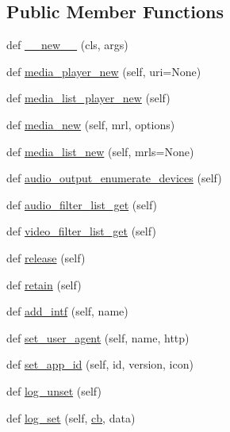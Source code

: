 \subsection*{Public Member Functions}
\begin{DoxyCompactItemize}
\item 
def \hyperlink{classvlc_1_1_instance_acc2aa3fac6a63e8bac4f19efc327102b}{\+\_\+\+\_\+new\+\_\+\+\_\+} (cls, args)
\item 
def \hyperlink{classvlc_1_1_instance_a356a94c765e690cec25514e36101c6d7}{media\+\_\+player\+\_\+new} (self, uri=None)
\item 
def \hyperlink{classvlc_1_1_instance_af64a515387ea79e6f6f97621283c4a33}{media\+\_\+list\+\_\+player\+\_\+new} (self)
\item 
def \hyperlink{classvlc_1_1_instance_ac9af019663459bddfa7376f3692754d9}{media\+\_\+new} (self, mrl, options)
\item 
def \hyperlink{classvlc_1_1_instance_ab3c8e7cd9dd61ca1657ba238cd4cf476}{media\+\_\+list\+\_\+new} (self, mrls=None)
\item 
def \hyperlink{classvlc_1_1_instance_a6fdfa4effb01d9a1ebfde60527f7508b}{audio\+\_\+output\+\_\+enumerate\+\_\+devices} (self)
\item 
def \hyperlink{classvlc_1_1_instance_a267774a685e64a5f8f666a4b6f8ac85f}{audio\+\_\+filter\+\_\+list\+\_\+get} (self)
\item 
def \hyperlink{classvlc_1_1_instance_a72cb3f80f491fa38104614e5966cc396}{video\+\_\+filter\+\_\+list\+\_\+get} (self)
\item 
def \hyperlink{classvlc_1_1_instance_a4cd51e19135e5ad4a19eae3ea9c60537}{release} (self)
\item 
def \hyperlink{classvlc_1_1_instance_a6394d82a0b79f0f91bb059d20ab43490}{retain} (self)
\item 
def \hyperlink{classvlc_1_1_instance_a2f16d4ca3ce5f13e304911d652e8bf6c}{add\+\_\+intf} (self, name)
\item 
def \hyperlink{classvlc_1_1_instance_a363684325b3a6baa1168f7f89f4b9bb4}{set\+\_\+user\+\_\+agent} (self, name, http)
\item 
def \hyperlink{classvlc_1_1_instance_adfcc438909535cf3bc6e8c0de2009db3}{set\+\_\+app\+\_\+id} (self, id, version, icon)
\item 
def \hyperlink{classvlc_1_1_instance_a7785fcbfc657f19465b52c9130d8df63}{log\+\_\+unset} (self)
\item 
def \hyperlink{classvlc_1_1_instance_ab18316368daf58ca970aa6369e9641eb}{log\+\_\+set} (self, \hyperlink{namespacevlc_a48994b0a618061e8aa4b2d314712d3da}{cb}, data)

\end{DoxyCompactItemize}
